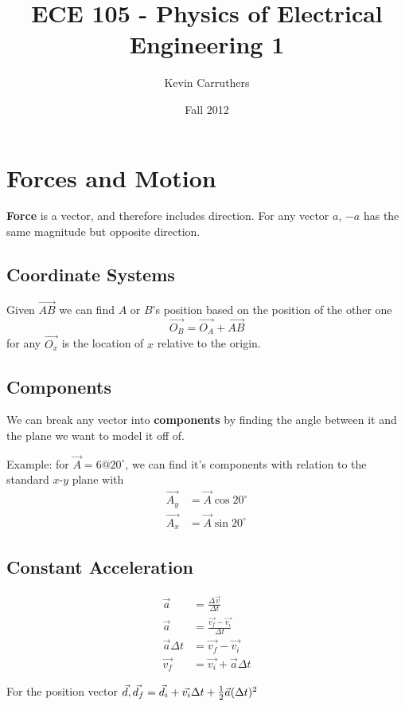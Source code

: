 \documentclass[12pt]{article}
\begin{document}
\title{ECE 105 - Physics of Electrical Engineering 1}
\author{Kevin Carruthers}
\date{\vspace{-2ex}Fall 2012}
\maketitle\HRule

\section*{Forces and Motion}
{\bf Force} is a vector, and therefore includes direction. For any vector $a$, $-a$ has the same magnitude but opposite direction.

\subsection*{Coordinate Systems}
Given $\vec{AB}$ we can find $A$ or $B$'s position based on the position of the other one \[ \vec{O_B} = \vec{O_A} + \vec{AB} \] for any $\vec{O_x}$ is the location of $x$ relative to the origin.

\subsection*{Components}
We can break any vector into {\bf components} by finding the angle between it and the plane we want to model it off of.

Example: for $\vec{A} = 6 @ 20^\circ$, we can find it's components with relation to the standard $x$-$y$ plane with
\begin{align*}
\vec{A_y} &= \vec{A}\cos 20^\circ\\
\vec{A_x} &= \vec{A}\sin 20^\circ
\end{align*}

\subsection*{Constant Acceleration}
\begin{align*}
\vec{a} &= \frac{\Delta\vec{v}}{\Delta t}\\
\vec{a} &= \frac{\vec{v_f}-\vec{v_i}}{\Delta t}\\
\vec{a}\Delta t &= \vec{v_f}-\vec{v_i}\\
\vec{v_f} &= \vec{v_i} + \vec{a}\Delta t
\end{align*}

For the position vector $\vec{d}, \vec{d_f} = \vec{d_i} + \vec{v_i}\Delta t + \frac{1}{2} \vec{a}(\Delta t)^2$
\end{document}

